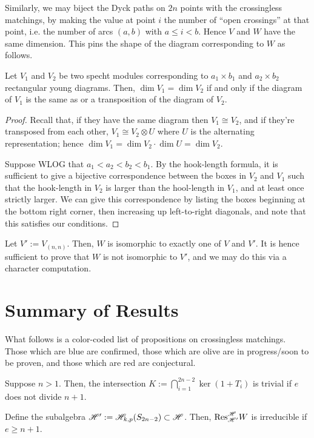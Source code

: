 \documentclass{amsart}
\begin{document}
Similarly, we may biject the Dyck paths on $2n$ points with the crossingless matchings, by making the value at point $i$ the number of ``open crossings'' at that point, i.e. the number of arcs $(a,b)$ with $a \leq i < b$.
Hence $V$ and $W$ have the same dimension.
This pins the shape of the diagram corresponding to $W$ as follows.

\begin{proposition}
  Let $V_1$ and $V_2$ be two specht modules corresponding to $a_1 \times b_1$ and $a_2 \times b_2$ rectangular young diagrams.
  Then, $\dim V_1 = \dim V_2$ if and only if the diagram of $V_1$ is the same as or a transposition of the diagram of $V_2$.
\end{proposition}
\begin{proof}
  Recall that, if they have the same diagram then $V_1 \cong V_2$, and if they're transposed from each other, $V_1 \cong V_2 \otimes U$ where $U$ is the alternating representation;
  hence $\dim V_1 = \dim V_2 \cdot \dim U = \dim V_2$.

  Suppose WLOG that $a_1 < a_2 < b_2 < b_1$.
  By the hook-length formula, it is sufficient to give a bijective correspondence between the boxes in $V_2$ and $V_1$ such that the hook-length in $V_2$ is larger than the hool-length in $V_1$, and at least once strictly larger.
  We can give this correspondence by listing the boxes beginning at the bottom right corner, then increasing up left-to-right diagonals, and note that this satisfies our conditions.
\end{proof}

Let $V' := V_{(n,n)}$.
Then, $W$ is isomorphic to exactly one of $V$ and $V'$.
It is hence sufficient to prove that $W$ is not isomorphic to $V'$, and we may do this via a character computation.

\newpage
\section{Summary of Results}
What follows is a color-coded list of propositions on crossingless matchings.
Those which are blue are {\color{blue}confirmed}, those which are olive are {\color{olive} in progress/soon to be proven}, and those which are red are {\color{red} conjectural}.

{\color{blue}
\begin{proposition}
  Suppose $n > 1$.
  Then, the intersection $K := \bigcap_{i = 1}^{2n - 2} \ker (1 + T_i)$ is trivial if $e$ does not divide $n + 1$.
\end{proposition}

\begin{proposition}
  Define the subalgebra $\mathscr{H}' := \mathscr{H}_{k,p}(S_{2n - 2}) \subset \mathscr{H}$.
  Then, $\text{Res}_{\mathscr{H}'}^{\mathscr{H}} W$ is irreducible if $e \geq n + 1$.
\end{proposition}}
\end{document}
